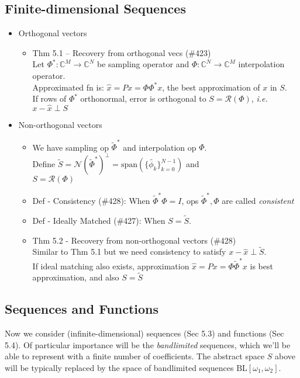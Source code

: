 \documentclass{article}
\newcommand{\ie}{\textit{i.e. }}
\newcommand{\cg}{\color{gray}}
\newcommand{\fs}{\footnotesize}
\begin{document}
\subsection*{Finite-dimensional Sequences}
\begin{itemize}
\setlength{\parindent}{0mm}
\item Orthogonal vectors
\begin{itemize}
	\item Thm 5.1 \--- Recovery from orthogonal vecs (\#423) \\
{\cg \fs Let $\Phi^{*}:\mathbb{C}^M\rightarrow \mathbb{C}^N$ be sampling operator and $\Phi:\mathbb{C}^N\rightarrow \mathbb{C}^M$ interpolation operator. \\
	Approximated fn is: $\hat{x} = Px = \Phi\Phi^{*}x$, the best approximation of $x$ in $S$. \\
	If rows of $\Phi^{*}$ orthonormal, error is orthogonal to $S=\mathcal{R}(\Phi)$, \ie $x-\hat{x}\perp S$} 
\end{itemize}
\item Non-orthogonal vectors 
\begin{itemize}
	\item We have sampling op $\tilde{\Phi}^{*}$ and interpolation op $\Phi$. \\
	{\cg\fs
	Define $\tilde{S}=\mathcal{N}(\tilde{\Phi}^{*})^{\perp}=\text{span}(\{\tilde{\phi_k}\}_{k=0}^{N-1})$ and \\
	$S=\mathcal{R}(\Phi)$}
	\item Def \-- Consistency (\#428): {\cg When $\tilde{\Phi}^{*}\Phi=I$, ops $\tilde{\Phi}^{*}, \Phi$ are called \textit{consistent}}
	\item Def \-- Ideally Matched (\#427): {\cg When $S=\tilde{S}$.}
	\item Thm 5.2 \-- Recovery from non-orthogonal vectors (\#428) \\
	{\cg\fs
	Similar to Thm 5.1 but we need consistency to satisfy $x-\hat{x}\perp \tilde{S}$. \\
	If ideal matching also exists, approximation $\hat{x}=Px=\Phi\tilde{\Phi}^*x$ is best approximation, and also $S=\tilde{S}$
	}
\end{itemize}
\end{itemize}

\subsection*{Sequences and Functions}
Now we consider (infinite-dimensional) sequences (Sec 5.3) and functions (Sec 5.4). Of particular importance will be the \textit{bandlimited} sequences, which we'll be able to represent with a finite number of coefficients. The abstract space $S$ above will be typically replaced by the space of bandlimited sequences $\text{BL}[\omega_1,\omega_2]$.
\end{document}
